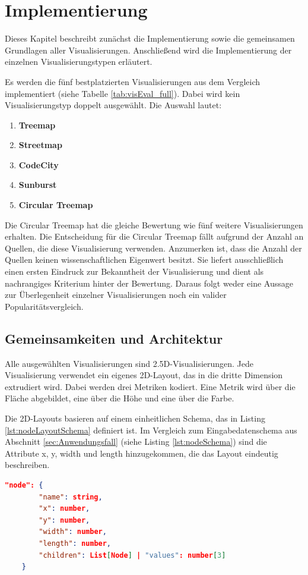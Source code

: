 \chapter{Implementierung} \label{sec:Implementierung}

Dieses Kapitel beschreibt zunächst die Implementierung sowie die gemeinsamen Grundlagen aller Visualisierungen. Anschließend wird die Implementierung der einzelnen Visualisierungstypen erläutert.

Es werden die fünf bestplatzierten Visualisierungen aus dem Vergleich implementiert (siehe Tabelle \ref{tab:visEval_full}). Dabei wird kein Visualisierungstyp doppelt ausgewählt. Die Auswahl lautet:
\begin{enumerate}
    \setlength{\itemsep}{0pt}
    \setlength{\parskip}{0pt}
    \setlength{\parsep}{0pt}
    \item \textbf{Treemap}
    \item \textbf{Streetmap}
    \item \textbf{CodeCity}
    \item \textbf{Sunburst}
    \item \textbf{Circular Treemap}
\end{enumerate}

Die Circular Treemap hat die gleiche Bewertung wie fünf weitere Visualisierungen erhalten. Die Entscheidung für die Circular Treemap fällt aufgrund der Anzahl an Quellen, die diese Visualisierung verwenden. Anzumerken ist, dass die Anzahl der Quellen keinen wissenschaftlichen Eigenwert besitzt. Sie liefert ausschließlich einen ersten Eindruck zur Bekanntheit der Visualisierung und dient als nachrangiges Kriterium hinter der Bewertung. Daraus folgt weder eine Aussage zur Überlegenheit einzelner Visualisierungen noch ein valider Popularitätsvergleich.

\section{Gemeinsamkeiten und Architektur} \label{sec:Architektur}

Alle ausgewählten Visualisierungen sind 2{.}5D-Visualisierungen. Jede Visualisierung verwendet ein eigenes 2D-Layout, das in die dritte Dimension extrudiert wird. Dabei werden drei Metriken kodiert. Eine Metrik wird über die Fläche abgebildet, eine über die Höhe und eine über die Farbe.

Die 2D-Layouts basieren auf einem einheitlichen Schema, das in Listing \ref{lst:nodeLayoutSchema} definiert ist. 
Im Vergleich zum Eingabedatenschema aus Abschnitt \ref{sec:Anwendungsfall} (siehe Listing \ref{lst:nodeSchema}) sind die Attribute x, y, width und length hinzugekommen, die das Layout eindeutig beschreiben.
\begin{lstlisting}[language=json, caption={Layout-Knotenschema}, label={lst:nodeLayoutSchema}]
    "node": {
        "name": string,
        "x": number,
        "y": number,
        "width": number,
        "length": number,
        "children": List[Node] | "values": number[3]
    }
\end{lstlisting}

